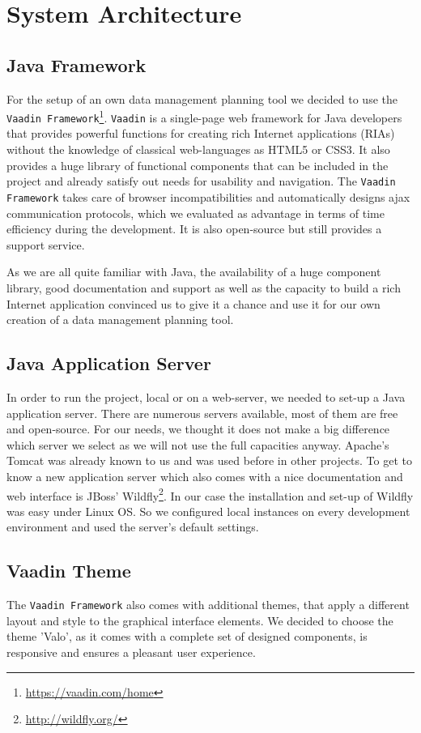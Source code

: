 \section{System Architecture}
\subsection{Java Framework}
For the setup of an own data management planning tool we decided to use the \texttt{Vaadin Framework}\footnote{\url{https://vaadin.com/home}}. \texttt{Vaadin} is a single-page web framework for Java developers that provides powerful functions for creating rich Internet applications (RIAs) without the knowledge of classical web-languages as HTML5 or CSS3. It also provides a huge library of functional components that can be included in the project and already satisfy out needs for usability and navigation.
The \texttt{Vaadin Framework} takes care of browser incompatibilities and automatically designs ajax communication protocols, which we evaluated as advantage in terms of time efficiency during the development. It is also open-source but still provides a support service. 

As we are all quite familiar with Java, the availability of a huge component library, good documentation and support as well as the capacity to build a rich Internet application convinced us to give it a chance and use it for our own creation of a data management planning tool.

\subsection{Java Application Server}
In order to run the project, local or on a web-server, we needed to set-up a Java application server. There are numerous servers available, most of them are free and open-source. For our needs, we thought it does not make a big difference which server we select as we will not use the full capacities anyway. 
Apache's Tomcat was already known to us and was used before in other projects. To get to know a new application server which also comes with a nice documentation and web interface is JBoss' Wildfly\footnote{\url{http://wildfly.org/}}. 
In our case the installation and set-up of Wildfly was easy under Linux OS. So we configured local instances on every development environment and used the server's default settings.

\subsection{Vaadin Theme}
The \texttt{Vaadin Framework} also comes with additional themes, that apply a different layout and style to the graphical interface elements. We decided to choose the theme 'Valo', as it comes with a complete set of designed components, is responsive and ensures a pleasant user experience.